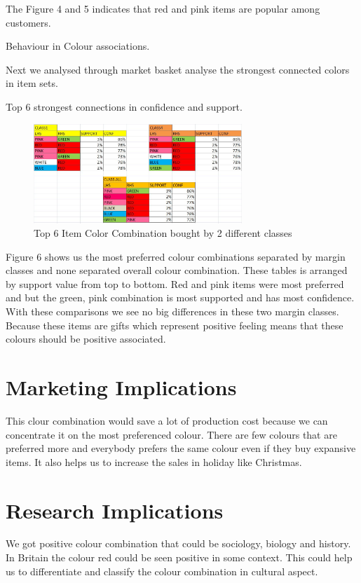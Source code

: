 \documentclass[11pt]{article}
\begin{document}
The Figure 4 and 5 indicates that red and pink items are popular among customers.

Behaviour in Colour associations.

Next we analysed through market basket analyse the strongest connected colors in item sets. 


Top 6 strongest connections in confidence and support.

\begin{figure}[!htp]        
  \centering
    \includegraphics[width=0.7\textwidth]{pics/Combination.jpg}
    \caption{Top 6 Item Color Combination bought by 2 different classes}
\end{figure}
Figure 6 shows us the most preferred colour combinations separated by margin classes and none separated overall colour combination. These tables is arranged by support value from top to bottom. Red and pink items were most preferred and but the green, pink combination is most supported and has most confidence. With these comparisons we see no big differences in these two margin classes.
Because these items are gifts which represent positive feeling means that these colours should be positive associated.
 

\newpage
\section{Marketing Implications}
This clour combination would save a lot of production cost because we can concentrate it on the most preferenced colour. There are few colours that are preferred more and everybody prefers the same colour even if they buy expansive items. It also helps us to increase the sales in holiday like Christmas.


\section{Research Implications}
We got positive colour combination that could be sociology, biology and history. 
In Britain the colour red could be seen positive in some context. This could help us to differentiate and classify the colour combination in cultural aspect. 
\end{document}
